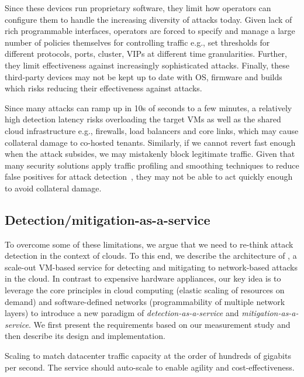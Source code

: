  Since these devices run proprietary software, they limit
how operators can configure them to handle the increasing diversity of attacks today. 
Given lack of rich programmable interfaces, 
operators are forced to specify and manage a large number of policies themselves  
for controlling traffic e.g., set thresholds for different protocols, ports, cluster, VIPs 
at different time granularities. Further, 
they limit effectiveness against increasingly 
sophisticated attacks.
Finally, these third-party devices may not be kept up to date with OS, firmware and builds which risks reducing their effectiveness against attacks. 

 Since many attacks can ramp up
in 10s of seconds to a few minutes, a
relatively high detection latency risks overloading the target VMs as
well as the shared cloud infrastructure e.g., firewalls, load
balancers and core links, which may cause collateral damage to
co-hosted tenants.  Similarly, if we cannot revert fast
enough when the attack subsides, we may mistakenly block legitimate
traffic. Given that many security solutions apply traffic
profiling and smoothing techniques to reduce false positives for
attack detection~\cite{peakflow}, they may not be able to act quickly
enough to avoid collateral damage.

\subsection{Detection/mitigation-as-a-service}
To overcome some of these limitations, we argue that we need to
re-think attack detection in the context of clouds.  To this end, we
describe the architecture of \nimbus, a scale-out VM-based service for
detecting and mitigating to network-based attacks in the cloud.  In contrast
to expensive hardware appliances, our key idea is to leverage the core
principles in cloud computing (elastic scaling of resources on demand)
and software-defined networks (programmability of multiple network
layers) to introduce a new paradigm of {\em detection-as-a-service}
and {\em mitigation-as-a-service}.  We first present the requirements
based on our measurement study and then describe its design and
implementation.

 Scaling to match datacenter traffic capacity at the order of hundreds of gigabits per second. 
The service should auto-scale to enable agility and cost-effectiveness.  

